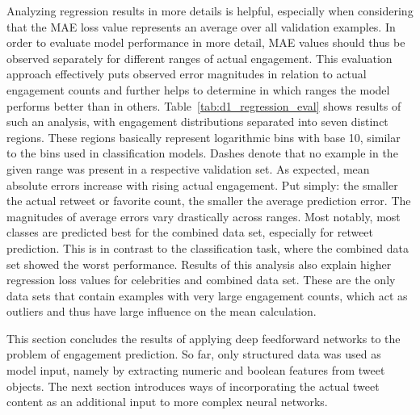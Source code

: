 Analyzing regression results in more details is helpful, especially when considering
that the MAE loss value represents an average over all validation examples.
In order to evaluate model performance in more detail, MAE values should thus be
observed separately for different ranges of actual engagement.
This evaluation approach effectively puts observed error magnitudes in relation
to actual engagement counts and further helps to determine in which ranges 
the model performs better than in others.
Table~\ref{tab:d1_regression_eval} shows results of such an analysis, with
engagement distributions separated into seven distinct regions.
These regions basically represent logarithmic bins with base 10, similar to
the bins used in classification models.
Dashes denote that no example in the given range was present in a respective
validation set.
As expected, mean absolute errors increase with rising actual engagement.
Put simply: the smaller the actual retweet or favorite count, the smaller the
average prediction error.
The magnitudes of average errors vary drastically across ranges.
Most notably, most classes are predicted best for the combined data set,
especially for retweet prediction.
This is in contrast to the classification task, where the combined data set
showed the worst performance.
Results of this analysis also explain higher regression loss values for
celebrities and combined data set.
These are the only data sets that contain examples with very large engagement
counts, which act as outliers and thus have large influence on the mean
calculation.

This section concludes the results of applying deep feedforward networks to
the problem of engagement prediction. 
So far, only structured data was used as model input, namely by extracting
numeric and boolean features from tweet objects.
The next section introduces ways of incorporating the actual tweet content as
an additional input to more complex neural networks.

